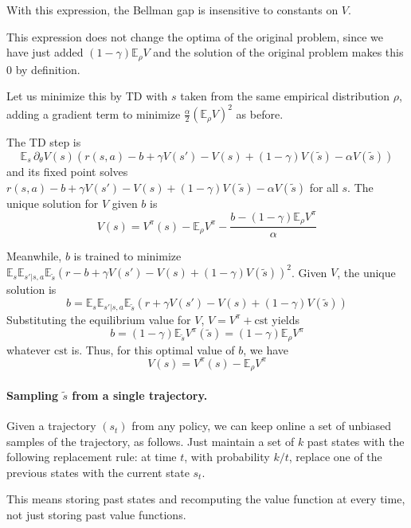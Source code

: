 \documentclass[11pt]{article}
\newcommand{\E}{\mathbb{E}}
\begin{document}
With this expression, the Bellman gap is insensitive to constants on $V$.

This expression does not change the optima of the original
problem, since we have just added $(1-\gamma)\E_\rho V$ and the solution
of the original problem makes this $0$ by definition.

Let us minimize this by TD with $s$ taken from the same
empirical distribution $\rho$, adding a gradient term to minimize
$\frac{\alpha}{2} (\E_\rho V)^2$ as before.

The TD step is
\begin{equation}
\E_s \,\partial_\theta V(s)\left(
r(s,a)-b+\gamma V(s')-V(s)+(1-\gamma)V(\tilde s)-\alpha V(\tilde s)
\right)
\end{equation}
and its fixed point solves $r(s,a)-b+\gamma V(s')-V(s)+(1-\gamma)V(\tilde
s)-\alpha V(\tilde s)$ for all $s$. The unique solution for $V$ given $b$ is
\begin{equation}
V(s)=V^\pi(s)-\E_\rho V^\pi-\frac{b-(1-\gamma)\E_\rho V^\pi}{\alpha}
\end{equation}

Meanwhile, $b$ is trained to minimize $\E_s\E_{s'|s,a}\E_{\tilde s} (r-b+\gamma
V(s')-V(s)+(1-\gamma)V(\tilde s))^2$. Given $V$, the unique solution is
\begin{equation}
b=\E_s\E_{s'|s,a}\E_{\tilde s}(r+\gamma
V(s')-V(s)+(1-\gamma)V(\tilde s))
\end{equation}
Substituting the equilibrium value for $V$, $V=V^\pi+\mathrm{cst}$ yields
\begin{equation}
b=(1-\gamma)\E_{\tilde s} V^\pi(\tilde s)=(1-\gamma)\E_\rho V^\pi
\end{equation}
whatever $\mathrm{cst}$ is. Thus, for this optimal value of $b$, we have
\begin{equation}
V(s)=V^\pi(s)-\E_\rho V^\pi
\end{equation}

\paragraph{Sampling $\tilde s$ from a single trajectory.} Given a
trajectory $(s_t)$ from any policy, we can keep online a set of unbiased
samples of the trajectory, as follows. Just maintain a set of $k$ past
states with the following replacement rule: at time $t$, with probability
$k/t$, replace one of the previous states with the current state $s_t$.

This means storing past states and recomputing the value function
at every time, not just storing past value functions.
\end{document}
